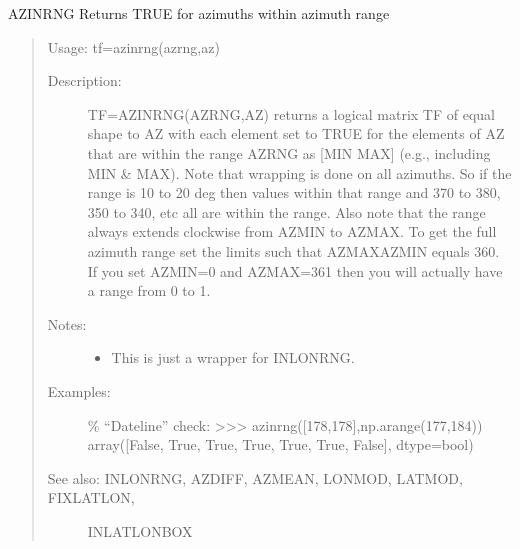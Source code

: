 \documentclass[letterpaper,10pt,english]{sphinxmanual}
\begin{document}
\begin{fulllineitems}
\label{\detokenize{infrapy.utils:infrapy.utils.latlon.azinrng}}
AZINRNG    Returns TRUE for azimuths within azimuth range
\begin{quote}

Usage:    tf=azinrng(azrng,az)
\begin{description}
\item[{Description:}] \leavevmode
TF=AZINRNG(AZRNG,AZ) returns a logical matrix TF of equal shape to AZ
with each element set to TRUE for the elements of AZ that are within
the range AZRNG as {[}MIN MAX{]} (e.g., including MIN \& MAX).  Note that
wrapping is done on all azimuths.  So if the range is 10 to 20 deg then
values within that range and 370 to 380, \sphinxhyphen{}350 to \sphinxhyphen{}340, etc all are
within the range.  Also note that the range always extends clockwise
from AZMIN to AZMAX.  To get the full azimuth range set the limits such
that AZMAX\sphinxhyphen{}AZMIN equals 360.  If you set AZMIN=0 and AZMAX=361 then you
will actually have a range from 0 to 1.

\item[{Notes:}] \leavevmode\begin{itemize}
\item {} 
This is just a wrapper for INLONRNG.

\end{itemize}

\item[{Examples:}] \leavevmode
\% “Dateline” check:
\textgreater{}\textgreater{}\textgreater{} azinrng({[}178,\sphinxhyphen{}178{]},np.arange(177,184))
array({[}False,  True,  True,  True,  True,  True, False{]}, dtype=bool)

\item[{See also: INLONRNG, AZDIFF, AZMEAN, LONMOD, LATMOD, FIXLATLON,}] \leavevmode
INLATLONBOX

\end{description}
\end{quote}

\end{fulllineitems}

\end{document}
